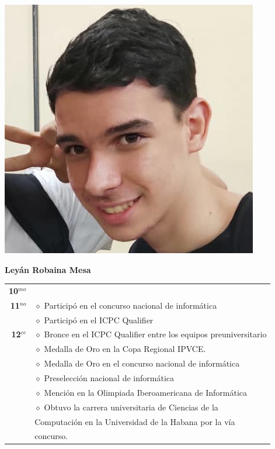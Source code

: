\begin{minipage}{0.2\textwidth}
	\includegraphics[width=\linewidth]{img/concursantes/leyan.png} %
\end{minipage}
\hfill
\begin{minipage}{0.7\textwidth}
	\textbf{Leyán Robaina Mesa}
	
	\vspace*{0.1in}
	\begin{tabular}{rl}
		
		\textbf{10$^{mo}$} &   \\
		
		\textbf{11$^{no}$} & $\diamond$ Participó en el concurso nacional de informática \\
		                   & $\diamond$ Participó en el ICPC Qualifier \\
		
		\textbf{12$^{ce}$} & $\diamond$ Bronce en el ICPC Qualifier entre los equipos preuniversitario  \\
		& $\diamond$ Medalla de Oro en la Copa Regional IPVCE.  \\ 
		& $\diamond$ Medalla de Oro en el concurso nacional de informática\\
		& $\diamond$ Preselección nacional de informática  \\
		& $\diamond$ Mención en la Olimpiada Iberoamericana de Informática  \\
		&  $\diamond$ Obtuvo la carrera universitaria de Ciencias de la \\
		& Computación en la Universidad de la Habana por la vía \\
		& concurso. \\
		
		
	\end{tabular}
\end{minipage}


